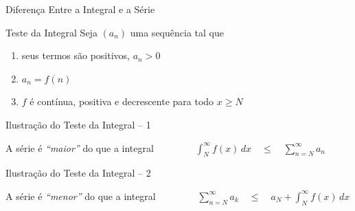 \documentclass[fleqn,utf8,aspectratio=169,12pt]{beamer}
\begin{document}
\begin{frame}{Diferença Entre a Integral e a Série}
  \begin{center}
    
  \end{center}
\end{frame}

\begin{frame}[t]{Teste da Integral}
  Seja $(a_n)$ uma sequência tal que
  \begin{enumerate}[<+->]
    \item seus termos são positivos, $a_n>0$
    \item $a_n=f(n)$
    \item $f$ é contínua, positiva e decrescente para todo $x \geq N$
  \end{enumerate}

\end{frame}

\begin{frame}{Ilustração do Teste da Integral -- 1}
  \begin{center}
    \scalebox{.9}{}
  \end{center}

  \pause
  A série é \emph{``maior''} do que a integral
  \pause
  \(
    \qquad\qquad
    \int_{N}^{\infty} f(x)\,dx
    \quad\leq\quad
    \sum_{n=N}^{\infty} a_n
  \)
\end{frame}

\begin{frame}{Ilustração do Teste da Integral -- 2}
  \begin{center}
    \scalebox{.9}{}
  \end{center}

  \pause
  A série é \emph{``menor''} do que a integral
  \pause
  \(
    \qquad\qquad
    \sum_{n=N}^\infty a_k
    \quad\leq\quad
    a_{N} + \int_{N}^\infty f(x)\,dx
  \)
\end{frame}
\end{document}
